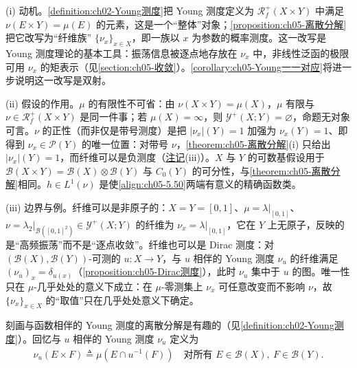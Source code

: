 \documentclass[../../main.tex]{subfiles}%
\begin{document}
\begin{remark}\label{remark:ch05-Young离散分解动机}
(i) 动机。\cref{definition:ch02-Young测度}把 Young 测度定义为 $\mathscr{R}^+_f(X\times Y)$ 中满足 $\nu(E\times Y)=\mu(E)$ 的元素，这是一个“整体”对象；\cref{proposition:ch05-离散分解}把它改写为“纤维族” $\{\nu_x\}_{x\in X}$，即一族以 $x$ 为参数的概率测度。这一改写是 Young 测度理论的基本工具：振荡信息被逐点地存放在 $\nu_x$ 中，非线性泛函的极限可用 $\nu_x$ 的矩表示（见\cref{section:ch05-收敛}）。\cref{corollary:ch05-Young一一对应}将进一步说明这一改写是双射。

(ii) 假设的作用。$\mu$ 的有限性不可省：由 $\nu(X\times Y)=\mu(X)$，$\mu$ 有限与 $\nu\in\mathscr{R}^+_f(X\times Y)$ 是同一件事；若 $\mu(X)=\infty$，则 $\mathcal{Y}^+(X;Y)=\varnothing$，命题无对象可言。$\nu$ 的正性（而非仅是带号测度）是把 $|\nu_x|(Y)=1$ 加强为 $\nu_x(Y)=1$、即得到 $\nu_x\in\mathcal{P}(Y)$ 的唯一位置：对带号 $\nu$，\cref{theorem:ch05-离散分解}(i) 只给出 $|\nu_x|(Y)=1$，而纤维可以是负测度（\hyperref[remark:ch05-离散分解动机]{注记}(iii)）。$X$ 与 $Y$ 的可数基假设用于 $\mathscr{B}(X\times Y)=\mathscr{B}(X)\otimes\mathscr{B}(Y)$ 与 $C_0(Y)$ 的可分性，与\cref{theorem:ch05-离散分解}相同。$h\in L^1(\nu)$ 是使\eqref{align:ch05-5.50}两端有意义的精确函数类。

(iii) 边界与例。纤维可以是非原子的：$X=Y=[0,1]$、$\mu=\lambda|_{[0,1]}$、$\nu=\lambda_2|_{\mathscr{B}([0,1]^2)}\in\mathcal{Y}^+(X;Y)$ 的纤维为 $\nu_x=\lambda|_{[0,1]}$，它在 $Y$ 上无原子，反映的是“高频振荡”而不是“逐点收敛”。纤维也可以是 Dirac 测度：对 $(\mathscr{B}(X),\mathscr{B}(Y))$-可测的 $u:X\to Y$，与 $u$ 相伴的 Young 测度 $\nu_u$ 的纤维满足 $(\nu_u)_x=\delta_{u(x)}$（\cref{proposition:ch05-Dirac测度}），此时 $\nu_u$ 集中于 $u$ 的图。唯一性只在 $\mu$-几乎处处的意义下成立：在 $\mu$-零测集上 $\nu_x$ 可任意改变而不影响 $\nu$，故 $\{\nu_x\}_{x\in X}$ 的“取值”只在几乎处处意义下确定。
\end{remark}

刻画与函数相伴的 Young 测度的离散分解是有趣的（见\cref{definition:ch02-Young测度}）。回忆与 $u$ 相伴的 Young 测度 $\nu_u$ 定义为
\begin{align*}
\nu_u(E\times F)\triangleq \mu(E\cap u^{-1}(F))
\quad\text{对所有 }E\in\mathscr{B}(X),\ F\in\mathscr{B}(Y).
\end{align*}
\end{document}
